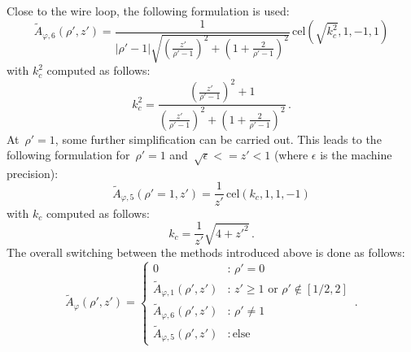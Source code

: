 Close to the wire loop, the following formulation is used:
\begin{equation}
  \tilde{A}_{\varphi,6} (\rho',z')
  = \frac{1}{|\rho' - 1| \sqrt{\left( \frac{z'}{\rho'-1} \right)^2 + \left(1 + \frac{2}{\rho'-1} \right)^2 }}
    \,\mathrm{cel}(\sqrt{k_c^2}, 1, -1, 1)
\end{equation}
with $k_c^2$ computed as follows:
\begin{equation}
  k_c^2 = \frac{\left( \frac{z'}{\rho'-1} \right)^2 + 1}{\left( \frac{z'}{\rho'-1} \right)^2 + \left(1 + \frac{2}{\rho'-1} \right)^2} \, .
\end{equation}
At~$\rho' = 1$, some further simplification can be carried out.
This leads to the following formulation for~$\rho' = 1$ and~$\sqrt{\epsilon} <= z' < 1$ (where $\epsilon$ is the machine precision):
\begin{equation}
  \tilde{A}_{\varphi,5} (\rho'=1, z') = \frac{1}{z'} \,\mathrm{cel}(k_c, 1, 1, -1)
\end{equation}
with $k_c$ computed as follows:
\begin{equation}
  k_c = \frac{1}{z'} \sqrt{4 + {z'}^2} \, .
\end{equation}
%
%
The overall switching between the methods introduced above is done as follows:
\begin{equation}
  \tilde{A}_\varphi (\rho', z')
  = \begin{cases}
      0                                 &:\, \rho' = 0            \\
      \tilde{A}_{\varphi,1} (\rho', z') &:\, z' \geq 1 \textrm{ or } \rho' \notin [1/2, 2] \\
      \tilde{A}_{\varphi,6} (\rho', z') &:\, \rho' \neq 1         \\
      \tilde{A}_{\varphi,5} (\rho', z') &:\, \textrm{else}
    \end{cases} \, .
\end{equation}

